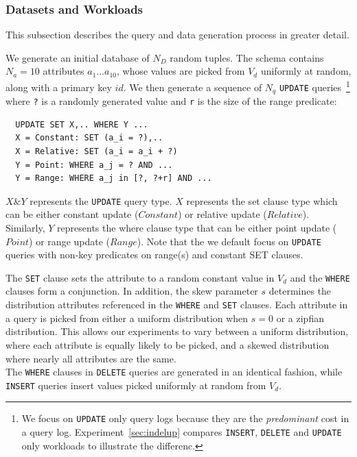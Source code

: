 \subsubsection{Datasets and Workloads}

This subsection describes the query and data generation process in greater detail.

 \label{sec:syntheticgen}
We generate an initial database of $N_D$ random tuples.  
The schema contains $N_a=10$ attributes $a_1\ldots a_{10}$, whose values are
picked from $V_d$ uniformly at random, along with a primary key $id$.
We then generate a sequence of $N_q$ \texttt{UPDATE} queries~\footnote{\scriptsize We focus on
\texttt{UPDATE} only query logs because they are the {\it predominant} cost 
in a query log.  Experiment~\ref{sec:indelup} compares \texttt{INSERT}, \texttt{DELETE} and \texttt{UPDATE}
only workloads to illustrate the differenc.} where 
\verb|?| is a randomly generated value and \verb|r| is the size of the range predicate: 
{\scriptsize
\begin{verbatim}
  UPDATE SET X,.. WHERE Y ...
  X = Constant: SET (a_i = ?),..
  X = Relative: SET (a_i = a_i + ?)
  Y = Point: WHERE a_j = ? AND ...
  Y = Range: WHERE a_j in [?, ?+r] AND ...
\end{verbatim}
}

$X \& Y$ represents the \texttt{UPDATE} query type. $X$ represents the set clause type which can be either constant update ($Constant$) or
relative update ($Relative$). Similarly, $Y$ represents the where clause type that can be either point update ($Point$) or
range update ($Range$). Note that the 
we default focus on \texttt{UPDATE} queries with non-key predicates on range(s) and constant SET clauses.

The \texttt{SET} clause sets the attribute to a random constant value in $V_d$ and 
the \texttt{WHERE} clauses form a conjunction.  
In addition, the skew parameter $s$ determines the distribution attributes referenced in the \texttt{WHERE} and \texttt{SET} clauses.  
Each attribute in a query is picked from either a uniform distribution when $s=0$ or a zipfian distribution.
This allows our experiments to vary between a uniform distribution, where each attribute is
equally likely to be picked, and a skewed distribution where nearly all attributes are the same. \\
The \texttt{WHERE} clauses in \texttt{DELETE} queries are generated in an identical fashion, while
\texttt{INSERT} queries insert values picked uniformly at random from $V_d$.

